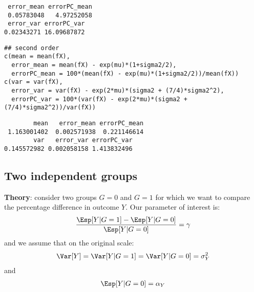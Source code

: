 \documentclass[12pt]{article}
\begin{document}
\begin{verbatim}
 error_mean errorPC_mean 
 0.05783048   4.97252058
 error_var errorPC_var 
0.02343271 16.09687872
\end{verbatim}

\lstset{language=r,label= ,caption= ,captionpos=b,numbers=none}
\begin{lstlisting}
## second order
c(mean = mean(fX),
  error_mean = mean(fX) - exp(mu)*(1+sigma2/2), 
  errorPC_mean = 100*(mean(fX) - exp(mu)*(1+sigma2/2))/mean(fX))
c(var = var(fX),
  error_var = var(fX) - exp(2*mu)*(sigma2 + (7/4)*sigma2^2), 
  errorPC_var = 100*(var(fX) - exp(2*mu)*(sigma2 + (7/4)*sigma2^2))/var(fX))
\end{lstlisting}

\begin{verbatim}
        mean   error_mean errorPC_mean 
 1.163001402  0.002571938  0.221146614
        var   error_var errorPC_var 
0.145572982 0.002058158 1.413832496
\end{verbatim}

\subsection{Two independent groups}
\label{sec:org849702e}

\textbf{Theory}: consider two groups \(G=0\) and \(G=1\) for which we want to compare
the percentage difference in outcome \(Y\). Our parameter of interest
is:
\begin{align*}
\frac{\Esp[Y|G=1]-\Esp[Y|G=0]}{\Esp[Y|G=0]} = \gamma
\end{align*}
and we assume that on the original scale:
\begin{align*}
\Var[Y] = \Var[Y|G=1]  = \Var[Y|G=0] = \sigma_Y^2
\end{align*}
and
\begin{align*}
\Esp[Y|G=0] = \alpha_Y
\end{align*}

\bigskip
\end{document}
